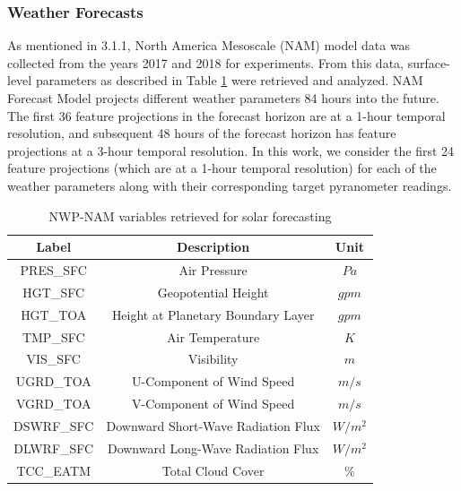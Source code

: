 \subsubsection*{Weather Forecasts}
\par As mentioned in 3.1.1, North America Mesoscale (NAM) model data was collected from the years 2017 and 2018 for experiments. From this data, surface-level parameters as described in Table \ref{Tab:table_nam_variables} were retrieved and analyzed. NAM Forecast Model projects different weather parameters 84 hours into the future. The first 36 feature projections in the forecast horizon are at a 1-hour temporal resolution, and subsequent 48 hours of the forecast horizon has feature projections at a 3-hour temporal resolution. In this work, we consider the first 24 feature projections (which are at a 1-hour temporal resolution) for each of the weather parameters along with their corresponding target pyranometer readings. 

\begin{table}[h]
\begin{center}
    \caption{NWP-NAM variables retrieved for solar forecasting}
    \label{Tab:table_nam_variables}
    \begin{tabular}{ c c c}
    	\toprule
    	\textbf{Label} & \textbf{Description} & \textbf{Unit} \\
    	\midrule
    	PRES\_SFC & Air Pressure & $Pa$\\
    	HGT\_SFC & Geopotential Height & $gpm$ \\
    	HGT\_TOA & Height at Planetary Boundary Layer & $gpm$ \\
    	TMP\_SFC & Air Temperature & $K$\\
    	VIS\_SFC & Visibility & $m$\\
    	UGRD\_TOA & U-Component of Wind Speed & $m/s$\\
    	VGRD\_TOA & V-Component of Wind Speed & $m/s$\\
    	DSWRF\_SFC & Downward Short-Wave Radiation Flux & $W/m^2$\\
    	DLWRF\_SFC & Downward Long-Wave Radiation Flux & $W/m^2$\\
    	TCC\_EATM & Total Cloud Cover & $\%$ \\
    	\bottomrule
    \end{tabular}
\end{center}
\end{table}

